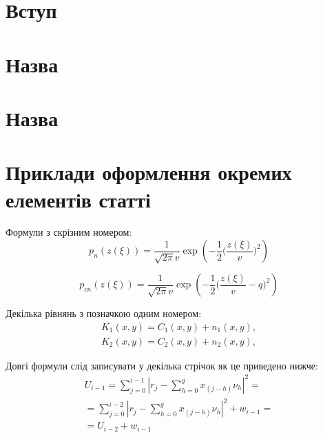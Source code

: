 %
%

\section*{Вступ}

 
\section{Назва}


\section{Назва}


\section{Приклади оформлення окремих елементів статті}

Формули з скрізним номером: 
\begin{equation}\label{radap1725eq1}
p_n(z(\xi)) = \frac{1}{\sqrt{2\pi} v} \exp  \left(-\frac{1}{2}\Bigg(\frac{z(\xi)}{v} \Bigg)^2 \right)
\end{equation}

\begin{equation}\label{radap1725eq2}
p_{cn}(z(\xi)) = \frac{1}{\sqrt{2\pi} v} \exp  \left(-\frac{1}{2}\Bigg(\frac{z(\xi)}{v}-q \Bigg)^2 \right) 
\end{equation}

Декілька рівнянь з позначкою одним номером:
\begin{equation*}
\begin{aligned}
{K_1}\left( {x,y} \right) = {C_1}\left( {x,y} \right) + {n_1}\left( {x,y} \right),\\	
{K_2}\left( {x,y} \right) = {C_2}\left( {x,y} \right) + {n_2}\left( {x,y} \right),
\end{aligned}
\end{equation*}

%

Довгі формули слід записувати у декілька стрічок як це приведено нижче:
\begin{multline}\label{radap1345eq2}
U_{i-1}= \sum\limits_{j=0}^{i-1}\left| r_j - \sum\limits_{h=0}^{g} x_{(j-h)} \nu_h \right|^2 =\\= \sum\limits_{j=0}^{i-2}\left| r_j - \sum\limits_{h=0}^{g} x_{(j-h)} \nu_h \right|^2 +w_{i-1} =\\= U_{i-2} + w_{i-1} 
\end{multline}

